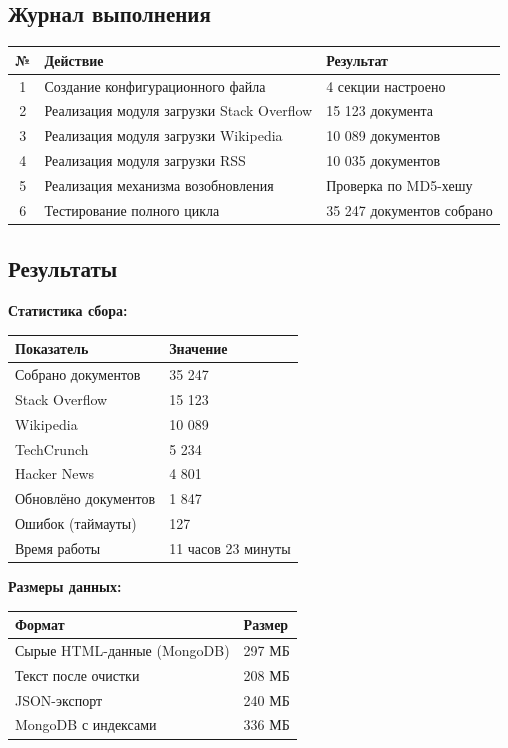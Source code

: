 \documentclass[a4paper, 12pt]{article}
\begin{document}
\subsection*{Журнал выполнения}
\begin{table}[h]
\centering
\begin{tabular}{|c|l|l|}
\hline
\textbf{№} & \textbf{Действие} & \textbf{Результат} \\ \hline
1 & Создание конфигурационного файла & 4 секции настроено \\ \hline
2 & Реализация модуля загрузки Stack Overflow & 15 123 документа \\ \hline
3 & Реализация модуля загрузки Wikipedia & 10 089 документов \\ \hline
4 & Реализация модуля загрузки RSS & 10 035 документов \\ \hline
5 & Реализация механизма возобновления & Проверка по MD5-хешу \\ \hline
6 & Тестирование полного цикла & 35 247 документов собрано \\ \hline
\end{tabular}
\end{table}

\subsection*{Результаты}
\textbf{Статистика сбора:}
\begin{table}[h]
\begin{tabular}{|l|l|}
\hline
\textbf{Показатель} & \textbf{Значение} \\ \hline
Собрано документов & 35 247 \\ \hline
Stack Overflow & 15 123 \\ \hline
Wikipedia & 10 089 \\ \hline
TechCrunch & 5 234 \\ \hline
Hacker News & 4 801 \\ \hline
Обновлёно документов & 1 847 \\ \hline
Ошибок (таймауты) & 127 \\ \hline
Время работы & 11 часов 23 минуты \\ \hline
\end{tabular}
\end{table}

\textbf{Размеры данных:}
\begin{table}[h]
\begin{tabular}{|l|l|}
\hline
\textbf{Формат} & \textbf{Размер} \\ \hline
Сырые HTML-данные (MongoDB) & 297 МБ \\ \hline
Текст после очистки & 208 МБ \\ \hline
JSON-экспорт & 240 МБ \\ \hline
MongoDB с индексами & 336 МБ \\ \hline
\end{tabular}
\end{table}
\end{document}
